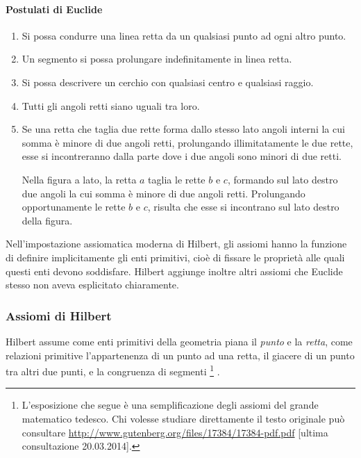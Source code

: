 \paragraph{Postulati di Euclide}
\begin{enumerate}[label=\Roman{*}., nosep]
\item Si possa condurre una linea retta da un qualsiasi punto ad ogni 
altro punto.
\item Un segmento si possa prolungare indefinitamente in linea retta.
\item Si possa descrivere un cerchio con qualsiasi centro e qualsiasi 
raggio.
\item Tutti gli angoli retti siano uguali tra loro.
\item Se una retta che taglia due rette forma dallo stesso lato 
angoli interni la cui somma è minore di due angoli retti, prolungando 
illimitatamente le due rette, esse si incontreranno dalla parte dove 
i due angoli sono minori di due retti.

\begin{minipage}{.49\textwidth}
\begin{center}\end{center}
\end{minipage}\hfil
\begin{minipage}{.45\textwidth}
Nella figura a lato, la retta \(a\) taglia le rette \(b\) e \(c\), formando 
sul lato destro due angoli la cui somma è minore di due angoli retti. 
Prolungando opportunamente le rette \(b\) e \(c\), risulta che esse si 
incontrano sul lato destro della figura.
\end{minipage}
\end{enumerate}

Nell'impostazione assiomatica moderna di Hilbert, gli assiomi hanno 
la funzione di definire implicitamente gli enti primitivi, cioè di 
fissare le proprietà alle quali questi enti devono soddisfare. 
Hilbert aggiunge inoltre altri assiomi che Euclide stesso non aveva 
esplicitato chiaramente.

\subsubsection*{Assiomi di Hilbert}\label{sect:ass_Hilbert}

Hilbert assume come enti primitivi della geometria piana il 
\emph{punto} e la \emph{retta}, come relazioni primitive 
l'appartenenza di un punto ad una retta, il giacere di un punto tra 
altri due punti, e la congruenza di segmenti
\footnote{L'esposizione che segue è una semplificazione degli assiomi del 
grande matematico tedesco. Chi volesse studiare direttamente 
il testo originale può consultare 
\url{http://www.gutenberg.org/files/17384/17384-pdf.pdf} [ultima 
consultazione 20.03.2014].}
.

